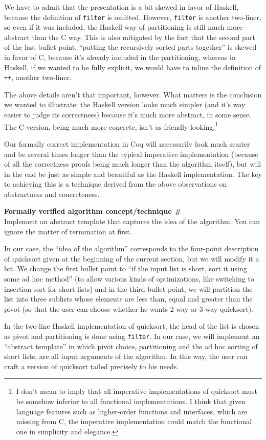 \documentclass[declaration,mgr,english,shortabstract]{iithesis}
\newcommand{\m}[1]{\texttt{#1}}
\newcounter{cnt}
\newcommand{\runcnt}{\#\arabic{cnt}}
\newcommand{\concept}[1]
{
    \refstepcounter{cnt}
    \begin{center}
        \textbf{Formally verified algorithm concept/technique \runcnt} \\
        #1
    \end{center}
}
\begin{document}
We have to admit that the presentation is a bit skewed in favor of Haskell, because the definition of \m{filter} is omitted. However, \m{filter} is another two-liner, so even if it was included, the Haskell way of partitioning is still much more abstract than the C way. This is also mitigated by the fact that the second part of the last bullet point, ``putting the recursively sorted parts together'' is skewed in favor of C, because it's already included in the partitioning, whereas in Haskell, if we wanted to be fully explicit, we would have to inline the definition of \m{++}, another two-liner.

The above details aren't that important, however. What matters is the conclusion we wanted to illustrate: the Haskell version looks much simpler (and it's way easier to judge its correctness) because it's much more abstract, in some sense. The C version, being much more concrete, isn't as friendly-looking.\footnote{I don't mean to imply that all imperative implementations of quicksort must be somehow inferior to all functional implementations. I think that given language features such as higher-order functions and interfaces, which are missing from C, the imperative implementation could match the functional one in simplicity and elegance.}

Our formally correct implementation in Coq will necessarily look much scarier and be several times longer than the typical imperative implementation (because of all the correctness proofs being much longer than the algorithm itself), but will in the end be just as simple and beautiful as the Haskell implementation. The key to achieving this is a technique derived from the above observations on abstractness and concreteness.

\concept{Implement an abstract template that captures the idea of the algorithm. You can ignore the matter of termination at first.}

In our case, the ``idea of the algorithm'' corresponds to the four-point description of quicksort given at the beginning of the current section, but we will modify it a bit. We change the first bullet point to ``if the input list is short, sort it using some ad hoc method'' (to allow various kinds of optimizations, like switching to insertion sort for short lists) and in the third bullet point, we will partition the list into three sublists whose elements are less than, equal and greater than the pivot (so that the user can choose whether he wants 2-way or 3-way quicksort).

In the two-line Haskell implementation of quicksort, the head of the list is chosen as pivot and partitioning is done using \m{filter}. In our case, we will implement an ``abstract template'' in which pivot choice, partitioning and the ad hoc sorting of short lists, are all input arguments of the algorithm. In this way, the user can craft a version of quicksort tailed precisely to his needs.
\end{document}
